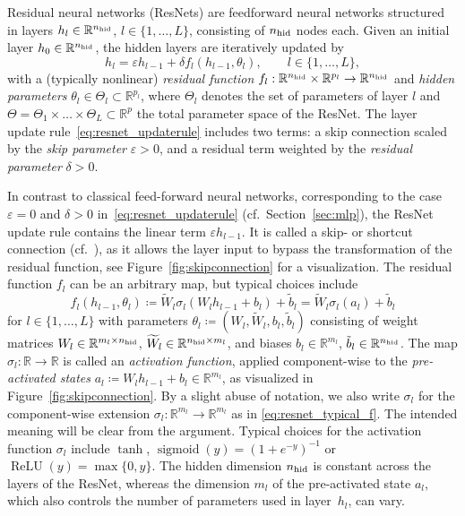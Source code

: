 \documentclass[10pt]{article}
\theoremstyle{definition}
\numberwithin{equation}{section}
\newcommand{\eps}{\varepsilon}
\newcommand{\R}{\mathbb{R}}
\newcommand*{\nhid}{n_\textup{hid}}
\begin{document}
Residual neural networks (ResNets) are feedforward neural networks structured in layers $h_l \in \R^{\nhid}$, $l \in \{1,\ldots,L\}$, consisting of $\nhid$ nodes each. Given an initial layer $h_0 \in \R^{\nhid}$, the hidden layers are iteratively updated by
\begin{equation} \label{eq:resnet_updaterule} 
	h_{l} = \eps h_{l-1} + \delta f_l(h_{l-1},\theta_l), \qquad  l \in \{1, \ldots, L\}, 
\end{equation}
with a (typically nonlinear) \emph{residual function} $f_l:\R^{\nhid} \times \R^{p_{l}} \rightarrow \R^{\nhid}$ and \emph{hidden parameters} $\theta_{l} \in \Theta_l \subset \R^{p_{l}}$, where $ \Theta_l$ denotes the set of parameters of layer $l$ and $\Theta = \Theta_1 \times \ldots \times \Theta_L \subset \R^p$ the total parameter space of the ResNet. The layer update rule~\eqref{eq:resnet_updaterule} includes two terms: a skip connection scaled by the \emph{skip parameter} $\eps> 0$, and a residual term weighted by the \emph{residual parameter} $\delta> 0$.

In contrast to classical feed-forward neural networks, corresponding to the case $\eps = 0$ and $\delta>0$ in~\eqref{eq:resnet_updaterule} (cf.~Section~\ref{sec:mlp}), the ResNet update rule contains the linear term $\eps h_{l-1}$. It is called a skip- or shortcut connection (cf.~\cite{he16}), as it allows the layer input to bypass the transformation of the residual function, see Figure~\ref{fig:skipconnection} for a visualization. The residual function $f_l$ can be an arbitrary map, but typical choices include
\begin{equation} \label{eq:resnet_typical_f} 
	f_l(h_{l-1},\theta_{l}) \coloneqq \widetilde{W}_l\sigma_l(W_lh_{l-1}+b_l)+\tilde{b}_l = \widetilde{W}_l\sigma_l(a_l)+\tilde{b}_l
\end{equation}
for $l \in \{1,\ldots,L\}$ with parameters $\theta_{l} \coloneqq (W_l, \widetilde{W}_l,b_l,\tilde{b}_l)$ consisting of weight matrices $W_l \in \R^{m_l \times \nhid}$, $\widetilde{W}_l \in \R^{\nhid \times m_l}$, and biases $b_l \in \R^{m_l}$, $\tilde b_l \in \R^{\nhid}$. The map $\sigma_l: \R \rightarrow \R$ is called an \emph{activation function}, applied component-wise to the \emph{pre-activated states} $a_l \coloneqq W_l h_{l-1} + b_l \in \R^{m_l}$, as visualized in Figure~\ref{fig:skipconnection}. By a slight abuse of notation, we also write $\sigma_l$ for the component-wise extension $\sigma_l:\R^{m_l} \rightarrow \R^{m_l}$ as in \eqref{eq:resnet_typical_f}. The intended meaning will be clear from the argument. Typical choices for the activation function $\sigma_l$ include $\tanh$, $\operatorname{sigmoid}(y) = (1+e^{-y})^{-1}$ or $\operatorname{ReLU}(y) = \max\{0,y\}$. The hidden dimension $\nhid$ is constant across the layers of the ResNet, whereas the dimension $m_l$ of the pre-activated state $a_l$, which also controls the number of parameters used in layer~$h_l$, can vary.
\end{document}

